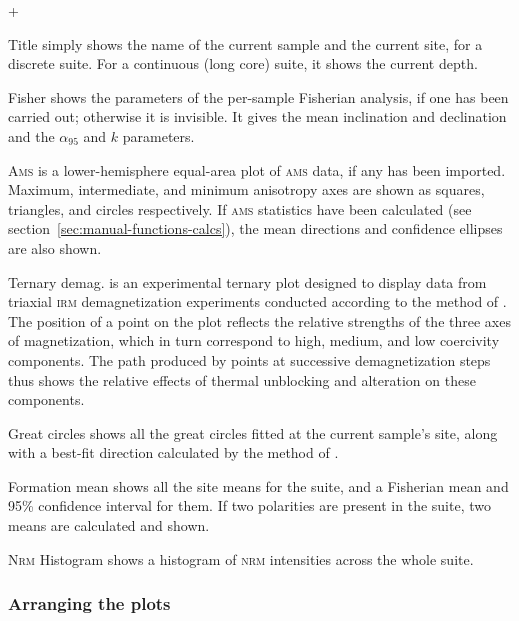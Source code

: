 \documentclass[a4paper]{article}
\newcommand{\menuitemlabel}[1]{%
\mbox{\textsf{#1}}\hfil}
\newenvironment{menuitemlist}%
{\begin{list}{}{%
\renewcommand{\makelabel}{\menuitemlabel}%
\setlength{\labelwidth}{35pt}%
\setlength{\leftmargin}%
             {\labelwidth+\labelsep}}}%
{\end{list}}
\newcommand{\caps}[1]{\textsc{#1}} %
\newcommand{\alnifi}{$\alpha_{95}$}
\begin{document}
\begin{menuitemlist}
\item[Title] simply shows the name of the current sample and
the current site, for a discrete suite. For a continuous (long core)
suite, it shows the current depth.

\item[Fisher] shows the parameters of the per-sample Fisherian analysis, if
  one has been carried out; otherwise it is invisible. It gives the mean
  inclination and declination and the \alnifi{} and $k$ parameters.

\item[\caps{Ams}] is a lower-hemisphere equal-area plot of
\caps{ams} data, if any has been imported. Maximum, intermediate, and
minimum anisotropy axes are shown as squares, triangles, and circles
respectively. If \caps{ams} statistics have been calculated (see
section~\ref{sec:manual-functions-calcs}), the mean directions and
confidence ellipses are also shown.

\item[Ternary demag.] is an experimental ternary plot designed
to display data from triaxial \caps{irm} demagnetization experiments
conducted according to the method of \cite{lowrie1990identification}.
The position of a point on the plot reflects the relative strengths
of the three axes of magnetization, which in turn correspond to
high, medium, and low coercivity components. The path produced
by points at successive demagnetization steps thus shows the relative
effects of thermal unblocking and alteration on these components.

\item[Great circles] shows all the great circles fitted at
the current sample's site, along with a best-fit direction calculated
by the method of \cite{mcfadden1988circles}.

\item[Formation mean] shows all the site means for the suite,
and a Fisherian mean and 95\% confidence interval for them.
If two polarities are present in the suite, two means are calculated
and shown.

\item[\caps{Nrm} Histogram] shows a histogram of \caps{nrm}
intensities across the whole suite.

\end{menuitemlist}

\subsubsection{\label{sec:manual-move-plots}Arranging the plots}
\end{document}

